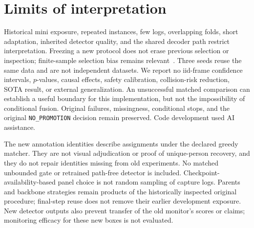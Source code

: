 \section{Limits of interpretation}
Historical mini exposure, repeated instances, few logs, overlapping folds, short adaptation, inherited detector quality, and the shared decoder path restrict interpretation. Freezing a new protocol does not erase previous selection or inspection; finite-sample selection bias remains relevant~\cite{Cawley2010Selection}. Three seeds reuse the same data and are not independent datasets. We report no iid-frame confidence intervals, $p$-values, causal effects, safety calibration, collision-risk reduction, SOTA result, or external generalization. An unsuccessful matched comparison can establish a useful boundary for this implementation, but not the impossibility of conditional fusion. Original failures, missingness, conditional stops, and the original \texttt{NO\_PROMOTION} decision remain preserved. Code development used AI assistance.

The new annotation identities describe assignments under the declared greedy matcher. They are not visual adjudication or proof of unique-person recovery, and they do not repair identities missing from old experiments. No matched unbounded gate or retrained path-free detector is included. Checkpoint-availability-based panel choice is not random sampling of capture logs. Parents and backbone strategies remain products of the historically inspected original procedure; final-step reuse does not remove their earlier development exposure. New detector outputs also prevent transfer of the old monitor's scores or claims; monitoring efficacy for these new boxes is not evaluated.
